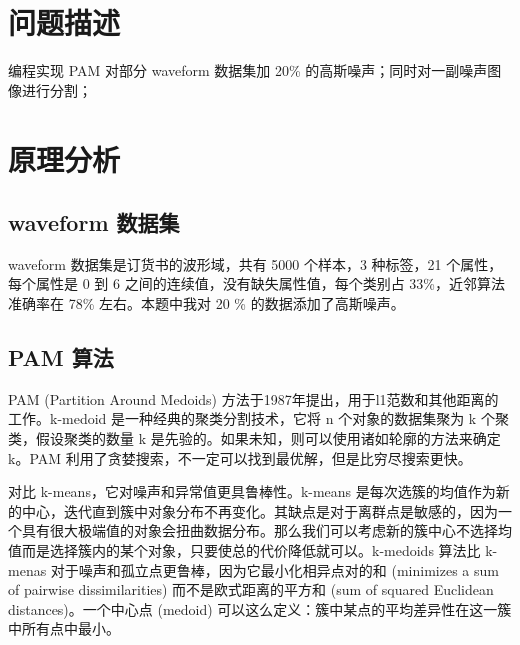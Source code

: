 \documentclass[12pt,AutoFakeBold]{article}
\begin{document}
\maketitle
\setcounter{tocdepth}{2}

\tableofcontents  %

\makeatletter
\begin{center}
    \LARGE \textbf{\textsf{\@problem}}
\end{center}
\makeatother


\section{问题描述}

编程实现 PAM 对部分 waveform 数据集加 20\% 的高斯噪声；同时对一副噪声图像进行分割； 

\section{原理分析}

\subsection{waveform 数据集}

waveform 数据集是订货书的波形域，共有 5000 个样本，3 种标签，21 个属性，每个属性是 0 到 6 之间的连续值，没有缺失属性值，每个类别占 33\%，近邻算法准确率在 78\% 左右。本题中我对 20 \% 的数据添加了高斯噪声。


\subsection{PAM 算法}

PAM (Partition Around Medoids) 方法于1987年提出，用于l1范数和其他距离的工作。k-medoid 是一种经典的聚类分割技术，它将 n 个对象的数据集聚为 k 个聚类，假设聚类的数量 k 是先验的。如果未知，则可以使用诸如轮廓的方法来确定 k。PAM 利用了贪婪搜索，不一定可以找到最优解，但是比穷尽搜索更快。

对比 k-means，它对噪声和异常值更具鲁棒性。k-means 是每次选簇的均值作为新的中心，迭代直到簇中对象分布不再变化。其缺点是对于离群点是敏感的，因为一个具有很大极端值的对象会扭曲数据分布。那么我们可以考虑新的簇中心不选择均值而是选择簇内的某个对象，只要使总的代价降低就可以。k-medoids 算法比 k-menas 对于噪声和孤立点更鲁棒，因为它最小化相异点对的和 (minimizes a sum of pairwise dissimilarities) 而不是欧式距离的平方和 (sum of squared Euclidean distances)。一个中心点 (medoid) 可以这么定义：簇中某点的平均差异性在这一簇中所有点中最小。
\end{document}
